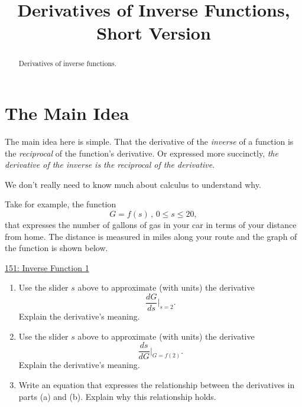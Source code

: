 \documentclass{ximera}
\title{Derivatives of Inverse Functions, Short Version}
\begin{document}
\begin{abstract}
Derivatives of inverse functions.
\end{abstract}
\maketitle

\section{The Main Idea}

The main idea here is simple. That the derivative of the \emph{inverse} of a function is the \emph{reciprocal} of the function's derivative. Or expressed more succinctly, \emph{the derivative of the inverse is the reciprocal of the derivative}.

We don't really need to know much about calculus to understand why. 

\begin{question} \label {Qtyhhdhfdgfd}
Take for example, the function
\[
      G = f(s)  \, , \, 0\leq s\leq 20, 
\]
that expresses the number of gallons of gas in your car in terms of your distance from home. The distance is measured in miles along your route and the graph of the function is shown below.

\begin{onlineOnly}
    \begin{center}
\end{center}
\end{onlineOnly}

\href{https://www.desmos.com/calculator/oltntpzth9}{151: Inverse Function 1}

\begin{enumerate}
\item Use the slider $s$ above to approximate (with units) the derivative
\[
   \frac{dG}{ds}\Big|_{s=2} .
\]
Explain the derivative's meaning.

\item Use the slider $s$ above to approximate (with units) the derivative
\[
   \frac{ds}{dG}\Big|_{G=f(2)} .
\]
Explain the derivative's meaning.

\item Write an equation that expresses the relationship between the derivatives in parts (a) and (b). Explain why this relationship holds.

\end{enumerate}
\end{question}
\end{document}
